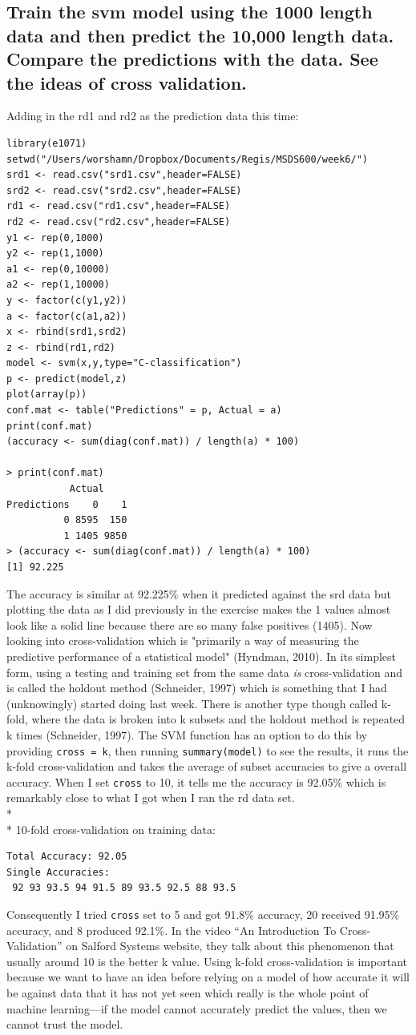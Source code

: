 \documentclass[10pt]{article}
\begin{document}
\subsection*{Train the svm model using the 1000 length data and then predict the 10,000 length data.  Compare the predictions with the data.  See the ideas of cross validation.} 
Adding in the rd1 and rd2 as the prediction data this time: 
\begin{verbatim}
library(e1071) 
setwd("/Users/worshamn/Dropbox/Documents/Regis/MSDS600/week6/") 
srd1 <- read.csv("srd1.csv",header=FALSE) 
srd2 <- read.csv("srd2.csv",header=FALSE) 
rd1 <- read.csv("rd1.csv",header=FALSE) 
rd2 <- read.csv("rd2.csv",header=FALSE) 
y1 <- rep(0,1000) 
y2 <- rep(1,1000) 
a1 <- rep(0,10000) 
a2 <- rep(1,10000) 
y <- factor(c(y1,y2)) 
a <- factor(c(a1,a2)) 
x <- rbind(srd1,srd2) 
z <- rbind(rd1,rd2) 
model <- svm(x,y,type="C-classification") 
p <- predict(model,z) 
plot(array(p)) 
conf.mat <- table("Predictions" = p, Actual = a) 
print(conf.mat) 
(accuracy <- sum(diag(conf.mat)) / length(a) * 100) 

> print(conf.mat) 
           Actual 
Predictions    0    1 
          0 8595  150 
          1 1405 9850 
> (accuracy <- sum(diag(conf.mat)) / length(a) * 100) 
[1] 92.225 
\end{verbatim}
The accuracy is similar at 92.225\% when it predicted against the srd data but plotting the data as I did previously in the exercise makes the 1 values almost look like a solid line because there are so many false positives (1405). Now looking into cross-validation which is "primarily a way of measuring the predictive performance of a statistical model" (Hyndman, 2010). In its simplest form, using a testing and training set from the same data \textit{is} cross-validation and is called the holdout method (Schneider, 1997) which is something that I had (unknowingly) started doing last week. There is another type though called k-fold, where the data is broken into k subsets and the holdout method is repeated k times (Schneider, 1997). The SVM function has an option to do this by providing \verb|cross = k|, then running \verb|summary(model)| to see the results, it runs the k-fold cross-validation and takes the average of subset accuracies to give a overall accuracy. When I set \verb|cross| to 10, it tells me the accuracy is 92.05\% which is remarkably close to what I got when I ran the rd data set. \\*\\*
10-fold cross-validation on training data: 
\begin{verbatim}
Total Accuracy: 92.05  
Single Accuracies: 
 92 93 93.5 94 91.5 89 93.5 92.5 88 93.5  
\end{verbatim}
Consequently I tried \verb|cross| set to 5 and got 91.8\% accuracy, 20 received 91.95\% accuracy, and 8 produced 92.1\%. In the video “An Introduction To Cross-Validation” on Salford Systems website, they talk about this phenomenon that usually around 10 is the better k value. Using k-fold cross-validation is important because we want to have an idea before relying on a model of how accurate it will be against data that it has not yet seen which really is the whole point of machine learning—if the model cannot accurately predict the values, then we cannot trust the model.  
\end{document}
